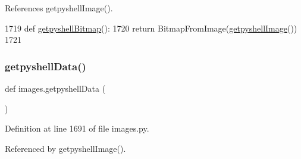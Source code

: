 References getpyshell\+Image().


\begin{DoxyCode}
1719 \textcolor{keyword}{def }\hyperlink{namespaceimages_a09ec6a51e2a48611d87400f71f606d42}{getpyshellBitmap}():
1720     \textcolor{keywordflow}{return} BitmapFromImage(\hyperlink{namespaceimages_a9ea41392546f608f23ba3f4674061fa3}{getpyshellImage}())
1721 
\end{DoxyCode}
\mbox{\label{namespaceimages_a93fd0751fa8042ffd073aea24eb2dec0}} 
\subsubsection{\texorpdfstring{getpyshell\+Data()}{getpyshellData()}}
{\footnotesize\ttfamily def images.\+getpyshell\+Data (\begin{DoxyParamCaption}{ }\end{DoxyParamCaption})}



Definition at line 1691 of file images.\+py.



Referenced by getpyshell\+Image().


